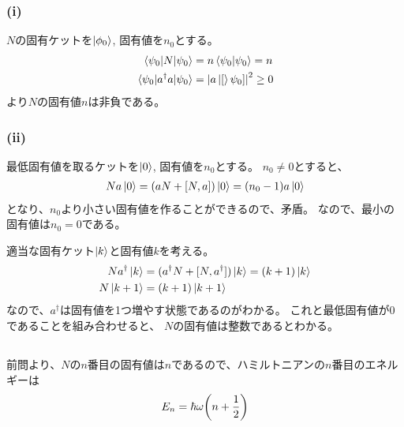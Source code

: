\documentclass[../../sp_2018.tex]{subfiles}
\begin{document}
\subsubsection*{(i)}
\(N\)の固有ケットを\(\ket{\phi_0}\), 固有値を\(n_0\)とする。
\begin{equation}\begin{aligned}[b]
    \mel{\psi_0}{N}{\psi_0}&=n\braket{\psi_0}{\psi_0} = n\\
    \mel{\psi_0}{a^\dagger a}{\psi_0} &= \abs{a\ket[\psi_0]}^2 \geq 0
\end{aligned}\end{equation}
より\(N\)の固有値\(n\)は非負である。
\subsubsection*{(ii)}
最低固有値を取るケットを\(\ket{0}\), 固有値を\(n_0\)とする。
\(n_0\neq0\)とすると、
\begin{equation}\begin{aligned}[b]
    Na\ket{0} = (aN+[N,a])\ket{0}=(n_0-1)a\ket{0}
\end{aligned}\end{equation}
となり、\(n_0\)より小さい固有値を作ることができるので、矛盾。
なので、最小の固有値は\(n_0=0\)である。

適当な固有ケット\(\ket{k}\)と固有値\(k\)を考える。
\begin{equation}\begin{aligned}[b]
    Na^\dagger\ket{k} &= (a^\dagger N+[N,a^\dagger])\ket{k} = (k+1)\ket{k}\\
    N\ket{k+1} &= (k+1)\ket{k+1}
\end{aligned}\end{equation}
なので、\(a^\dagger\)は固有値を1つ増やす状態であるのがわかる。
これと最低固有値が\(0\)であることを組み合わせると、
\(N\)の固有値は整数であるとわかる。

\subsection{}
前問より、\(N\)の\(n\)番目の固有値は\(n\)であるので、ハミルトニアンの\(n\)番目のエネルギーは
\begin{equation}\begin{aligned}[b]
    E_n = \hbar\omega\qty(n+\frac{1}{2})
\end{aligned}\end{equation}
\end{document}
